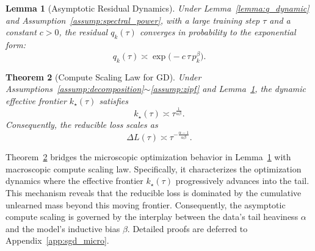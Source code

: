 \documentclass{article}
\theoremstyle{plain}
\newtheorem{theorem}{Theorem}[section]
\newtheorem{lemma}[theorem]{Lemma}
\theoremstyle{definition}
\theoremstyle{remark}
\begin{document}
\begin{lemma}[Asymptotic Residual Dynamics]
    \label{lemma:q_dynamic_exp}
    Under Lemma~\ref{lemma:q_dynamic} and Assumption~\ref{assump:spectral_power}, with a large training step $\tau$ and a constant $c>0$, the residual $q_k(\tau)$ converges in probability to the exponential form:
    \begin{equation}
        \label{eq:exponential_decay}
        q_k(\tau) \asymp \exp\!\big(-c\,\tau\,p_k^{\beta}\big).
    \end{equation}
\end{lemma}


\begin{theorem}[Compute Scaling Law for GD]
    \label{thm:sgd_scaling}
    Under Assumptions~\ref{assump:decomposition}$\sim$\ref{assump:zipf} and Lemma~\ref{lemma:q_dynamic_exp}, the dynamic effective frontier $k_\star(\tau)$ satisfies
    \begin{equation*}
        \label{eq:frontier_scaling}
        k_\star(\tau) \asymp \tau^{\frac{1}{\alpha\beta}}.
    \end{equation*}
    Consequently, the reducible loss scales as
    \begin{equation*}
        \label{eq:sgd_scaling_result}
        \boxed{\Delta L(\tau) \asymp \tau^{-\frac{\alpha-1}{\alpha\beta}}.}
    \end{equation*}
\end{theorem}
Theorem~\ref{thm:sgd_scaling} bridges the microscopic optimization behavior in Lemma~\ref{lemma:q_dynamic_exp} with macroscopic compute scaling law.
Specifically, it characterizes the optimization dynamics where the effective frontier $k_\star(\tau)$ progressively advances into the tail.
This mechanism reveals that the reducible loss is dominated by the cumulative unlearned mass beyond this moving frontier.
Consequently, the asymptotic compute scaling is governed by the interplay between the data's tail heaviness $\alpha$ and the model's inductive bias $\beta$.
Detailed proofs are deferred to Appendix~\ref{app:sgd_micro}. 
 
\end{document}
